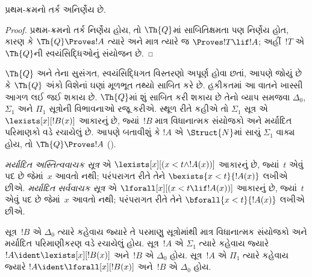 \begin{cor}
પ્રથમ-ક્રમનો તર્ક અનિર્ણેય છે.
\end{cor}

\begin{proof}
પ્રથમ-ક્રમનો તર્ક નિર્ણેય
હોય, તો $\Th{Q}$માં
સાબિતિક્ષમતા પણ નિર્ણેય
હોત, કારણ કે
$\Th{Q} \Proves !A$ ત્યારે અને
માત્ર ત્યારે જ
$\Proves !T \lif !A$;
અહીં~$!T$ એ $\Th{Q}$ની
સ્વયંસિદ્ધિઓનું સંયોજન છે.
\end{proof}
\endgroup


\begingroup
\makeatletter{}\makeatother

\label{guunit:OLP-0300}


$\Th{Q}$ અને તેના સુસંગત,
સ્વયંસિદ્ધિગત વિસ્તરણો અપૂર્ણ
હોવા છતાં, આપણે જોયું છે કે
$\Th{Q}$ અંકો વિશેનાં ઘણાં
મૂળભૂત તથ્યો સાબિત કરે છે.
હકીકતમાં આ વાતને ખાસ્સી
આગળ લઈ જઈ શકાય છે.
$\Th{Q}$માં શું સાબિત કરી
શકાય છે તેનો વ્યાપ સમજવા
$\Delta_0$, $\Sigma_1$ અને
$\Pi_1$ સૂત્રોની
વિભાવનાઓ રજૂ કરીએ.
સ્થૂળ રીતે કહીએ તો
$\Sigma_1$ સૂત્ર એ
$\lexists[x][!B(x)]$ આકારનું
છે, જ્યાં~$!B$ માત્ર વિધાનાત્મક
સંયોજકો અને મર્યાદિત પરિમાણકો
વડે રચાયેલું છે. આપણે બતાવીશું
કે $!A$ એ $\Struct{N}$માં
સાચું $\Sigma_1$ વાક્ય
હોય, તો $\Th{Q} \Proves !A$
().

\begin{defn}
\emph{મર્યાદિત અસ્તિત્વવાચક
સૂત્ર} એ
$\lexists[x][(x < t \land !A(x))]$
આકારનું છે, જ્યાં~$t$ એવું પદ છે જેમાં~$x$ આવતો નથી; પરંપરાગત રીતે તેને
$\bexists{x < t}{!A(x)}$
લખીએ છીએ.
\emph{મર્યાદિત સર્વવાચક
સૂત્ર} એ
$\lforall[x][(x < t \lif !A(x))]$
આકારનું છે, જ્યાં~$t$ એવું પદ છે જેમાં~$x$ આવતો નથી; પરંપરાગત રીતે તેને
$\bforall{x < t}{!A(x)}$
લખીએ છીએ.
\end{defn}

\begin{defn}
સૂત્ર~$!B$ એ $\Delta_0$
ત્યારે કહેવાય જ્યારે તે
પરમાણુ સૂત્રોમાંથી
માત્ર વિધાનાત્મક સંયોજકો
અને મર્યાદિત પરિમાણીકરણ
વડે રચાયેલું હોય.
સૂત્ર~$!A$ એ $\Sigma_1$
ત્યારે કહેવાય જ્યારે
$!A \ident \lexists[x][!B(x)]$
અને~$!B$ એ $\Delta_0$ હોય.
સૂત્ર~$!A$ એ $\Pi_1$
ત્યારે કહેવાય જ્યારે
$!A \ident \lforall[x][!B(x)]$
અને~$!B$ એ $\Delta_0$ હોય.
\end{defn}

